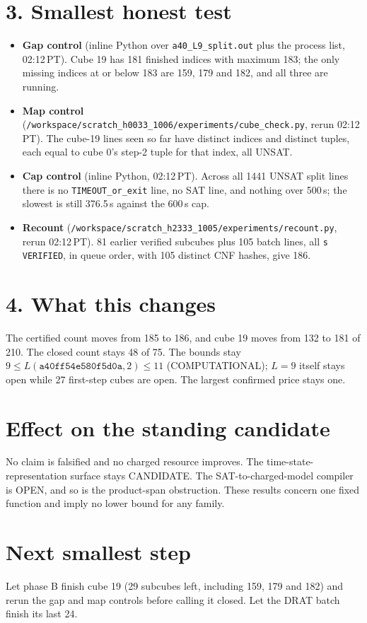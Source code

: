 \documentclass[11pt]{article}
\begin{document}
\section*{3. Smallest honest test}
\begin{itemize}
\item \textbf{Gap control} (inline Python over \texttt{a40\_L9\_split.out} plus the process list, 02:12\,PT). Cube 19 has 181 finished indices with maximum 183; the only missing indices at or below 183 are 159, 179 and 182, and all three are running.
\item \textbf{Map control} (\texttt{/workspace/scratch\_h0033\_1006/experiments/cube\_check.py}, rerun 02:12\,PT). The cube-19 lines seen so far have distinct indices and distinct tuples, each equal to cube 0's step-2 tuple for that index, all UNSAT.
\item \textbf{Cap control} (inline Python, 02:12\,PT). Across all 1441 UNSAT split lines there is no \texttt{TIMEOUT\_or\_exit} line, no SAT line, and nothing over 500\,s; the slowest is still 376.5\,s against the 600\,s cap.
\item \textbf{Recount} (\texttt{/workspace/scratch\_h2333\_1005/experiments/recount.py}, rerun 02:12\,PT). 81 earlier verified subcubes plus 105 batch lines, all \texttt{s VERIFIED}, in queue order, with 105 distinct CNF hashes, give 186.
\end{itemize}

\section*{4. What this changes}
The certified count moves from 185 to 186, and cube 19 moves from 132 to 181 of 210. The closed count stays 48 of 75. The bounds stay $9\le L(\texttt{a40ff54e580f5d0a},2)\le 11$ (COMPUTATIONAL); $L=9$ itself stays open while 27 first-step cubes are open. The largest confirmed price stays one.

\section*{Effect on the standing candidate}
No claim is falsified and no charged resource improves. The time-state-representation surface stays CANDIDATE. The SAT-to-charged-model compiler is OPEN, and so is the product-span obstruction. These results concern one fixed function and imply no lower bound for any family.

\section*{Next smallest step}
Let phase B finish cube 19 (29 subcubes left, including 159, 179 and 182) and rerun the gap and map controls before calling it closed. Let the DRAT batch finish its last 24.
\end{document}
